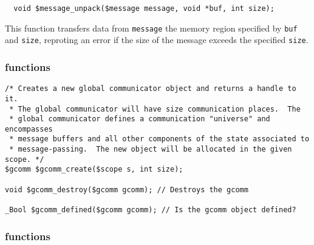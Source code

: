 \begin{verbatim}
  void $message_unpack($message message, void *buf, int size);
\end{verbatim}

This function transfers data from \texttt{message} the memory region specified by \texttt{buf} and \texttt{size}, reproting an error if the size of the message exceeds the specified \texttt{size}.

\subsubsection{\cgcomm{} functions}
\label{subsubsec:gcomm}

\begin{verbatim}
/* Creates a new global communicator object and returns a handle to it.
 * The global communicator will have size communication places.  The
 * global communicator defines a communication "universe" and encompasses
 * message buffers and all other components of the state associated to
 * message-passing.  The new object will be allocated in the given scope. */
$gcomm $gcomm_create($scope s, int size);

void $gcomm_destroy($gcomm gcomm); // Destroys the gcomm

_Bool $gcomm_defined($gcomm gcomm); // Is the gcomm object defined?
\end{verbatim}

\subsubsection{\ccomm{} functions}
\label{subsubsec:comm}

